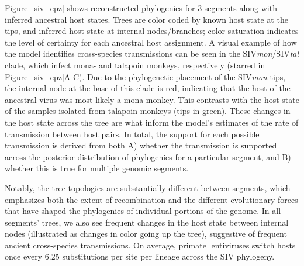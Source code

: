 Figure~\ref{siv_cpz} shows reconstructed phylogenies for 3 segments along with inferred ancestral host states.
Trees are color coded by known host state at the tips, and inferred host state at internal nodes/branches; color saturation indicates the level of certainty for each ancestral host assignment.
A visual example of how the model identifies cross-species transmissions can be seen in the SIV\textit{mon}/SIV\textit{tal} clade, which infect mona- and talapoin monkeys, respectively (starred in Figure~\ref{siv_cpz}A-C).
Due to the phylogenetic placement of the SIV\textit{mon} tips, the internal node at the base of this clade is red, indicating that the host of the ancestral virus was most likely a mona monkey.
This contrasts with the host state of the samples isolated from talapoin monkeys (tips in green).
These changes in the host state across the tree are what inform the model's estimates of the rate of transmission between host pairs.
In total, the support for each possible transmission is derived from both A) whether the transmission is supported across the posterior distribution of phylogenies for a particular segment, and B) whether this is true for multiple genomic segments.

Notably, the tree topologies are substantially different between segments, which emphasizes both the extent of recombination and the different evolutionary forces that have shaped the phylogenies of individual portions of the genome.
In all segments' trees, we also see frequent changes in the host state between internal nodes (illustrated as changes in color going up the tree), suggestive of frequent ancient cross-species transmissions.
On average, primate lentiviruses switch hosts once every 6.25 substitutions per site per lineage across the SIV phylogeny.

